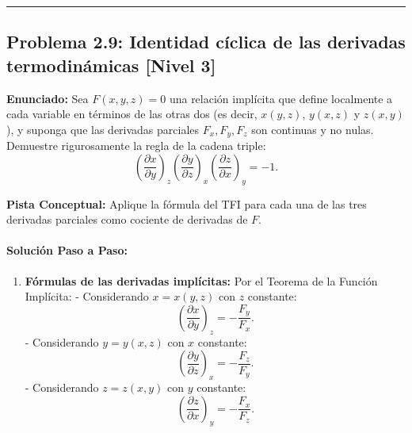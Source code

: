 \documentclass[11pt,a4paper]{article}
\begin{document}
\vspace{0.5cm}
\hrule
\vspace{0.5cm}

\subsection*{Problema 2.9: Identidad cíclica de las derivadas termodinámicas \hfill \color{primaryblue}\small[Nivel 3]}

\begin{tcolorbox}[colback=white,colframe=gray!40,arc=1mm,boxrule=0.5pt,left=3mm,right=3mm,top=2mm,bottom=2mm]
\textbf{Enunciado:} Sea $F(x,y,z) = 0$ una relación implícita que define localmente a cada variable en términos de las otras dos (es decir, $x(y,z)$, $y(x,z)$ y $z(x,y)$), y suponga que las derivadas parciales $F_x, F_y, F_z$ son continuas y no nulas. Demuestre rigurosamente la regla de la cadena triple:
\begin{equation*}
\left(\frac{\partial x}{\partial y}\right)_z \left(\frac{\partial y}{\partial z}\right)_x \left(\frac{\partial z}{\partial x}\right)_y = -1.
\end{equation*}
\end{tcolorbox}

\begin{tcolorbox}[colback=yellow!4,colframe=accentamber!70,arc=1mm,boxrule=0.5pt,left=3mm,right=3mm,top=1.5mm,bottom=1.5mm]
\textbf{Pista Conceptual:} Aplique la fórmula del TFI para cada una de las tres derivadas parciales como cociente de derivadas de $F$.
\end{tcolorbox}

\paragraph{Solución Paso a Paso:}\par
\begin{enumerate}[label=\textbf{\arabic*.}]
\item \textbf{Fórmulas de las derivadas implícitas:}
Por el Teorema de la Función Implícita:
- Considerando $x = x(y,z)$ con $z$ constante:
\begin{equation*}
\left(\frac{\partial x}{\partial y}\right)_z = -\frac{F_y}{F_x}.
\end{equation*}
- Considerando $y = y(x,z)$ con $x$ constante:
\begin{equation*}
\left(\frac{\partial y}{\partial z}\right)_x = -\frac{F_z}{F_y}.
\end{equation*}
- Considerando $z = z(x,y)$ con $y$ constante:
\begin{equation*}
\left(\frac{\partial z}{\partial x}\right)_y = -\frac{F_x}{F_z}.
\end{equation*}
\end{enumerate}
\end{document}
